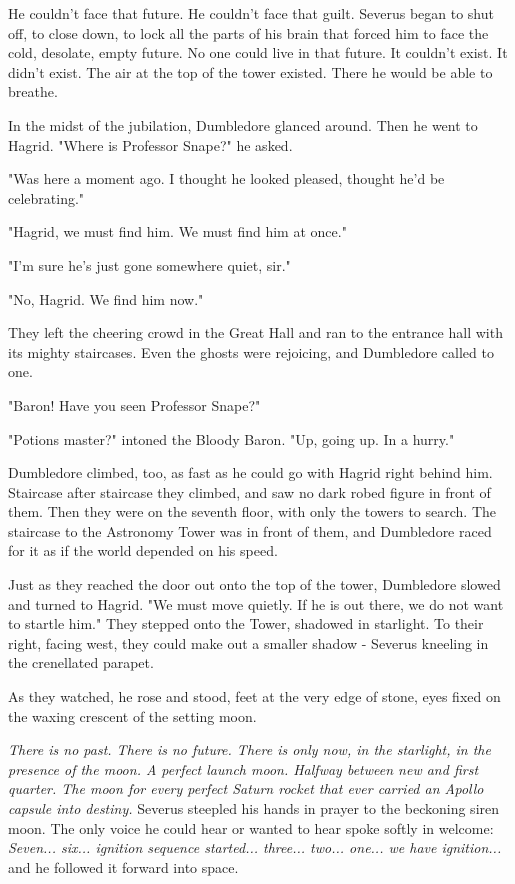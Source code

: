 He couldn't face that future. He couldn't face that guilt. Severus began to shut off, to close down, to lock all the parts of his brain that forced him to face the cold, desolate, empty future. No one could live in that future. It couldn't exist. It didn't exist. The air at the top of the tower existed. There he would be able to breathe.

In the midst of the jubilation, Dumbledore glanced around. Then he went to Hagrid. "Where is Professor Snape?" he asked.

"Was here a moment ago. I thought he looked pleased, thought he'd be celebrating."

"Hagrid, we must find him. We must find him at once."

"I'm sure he's just gone somewhere quiet, sir."

"No, Hagrid. We find him now."

They left the cheering crowd in the Great Hall and ran to the entrance hall with its mighty staircases. Even the ghosts were rejoicing, and Dumbledore called to one.

"Baron! Have you seen Professor Snape?"

"Potions master?" intoned the Bloody Baron. "Up, going up. In a hurry."

Dumbledore climbed, too, as fast as he could go with Hagrid right behind him. Staircase after staircase they climbed, and saw no dark robed figure in front of them. Then they were on the seventh floor, with only the towers to search. The staircase to the Astronomy Tower was in front of them, and Dumbledore raced for it as if the world depended on his speed.

Just as they reached the door out onto the top of the tower, Dumbledore slowed and turned to Hagrid. "We must move quietly. If he is out there, we do not want to startle him." They stepped onto the Tower, shadowed in starlight. To their right, facing west, they could make out a smaller shadow - Severus kneeling in the crenellated parapet.

As they watched, he rose and stood, feet at the very edge of stone, eyes fixed on the waxing crescent of the setting moon.

\emph{There is no past. There is no future. There is only now, in the starlight, in the presence of the moon. A perfect launch moon. Halfway between new and first quarter. The moon for every perfect Saturn rocket that ever carried an Apollo capsule into destiny.} Severus steepled his hands in prayer to the beckoning siren moon. The only voice he could hear or wanted to hear spoke softly in welcome: \emph{Seven... six... ignition sequence started... three... two... one... we have ignition...} and he followed it forward into space.

